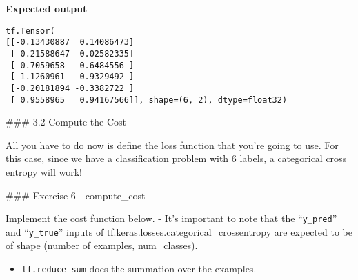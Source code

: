 \documentclass[11pt]{article}
\providecommand{\tightlist}{%
      \setlength{\itemsep}{0pt}\setlength{\parskip}{0pt}}
\begin{document}
    \textbf{Expected output}

\begin{verbatim}
tf.Tensor(
[[-0.13430887  0.14086473]
 [ 0.21588647 -0.02582335]
 [ 0.7059658   0.6484556 ]
 [-1.1260961  -0.9329492 ]
 [-0.20181894 -0.3382722 ]
 [ 0.9558965   0.94167566]], shape=(6, 2), dtype=float32)
\end{verbatim}

    \#\#\# 3.2 Compute the Cost

All you have to do now is define the loss function that you're going to
use. For this case, since we have a classification problem with 6
labels, a categorical cross entropy will work!

\#\#\# Exercise 6 - compute\_cost

Implement the cost function below. - It's important to note that the
``\texttt{y\_pred}'' and ``\texttt{y\_true}'' inputs of
\href{https://www.tensorflow.org/api_docs/python/tf/keras/losses/categorical_crossentropy}{tf.keras.losses.categorical\_crossentropy}
are expected to be of shape (number of examples, num\_classes).

\begin{itemize}
\tightlist
\item
  \texttt{tf.reduce\_sum} does the summation over the examples.
\end{itemize}
\end{document}
